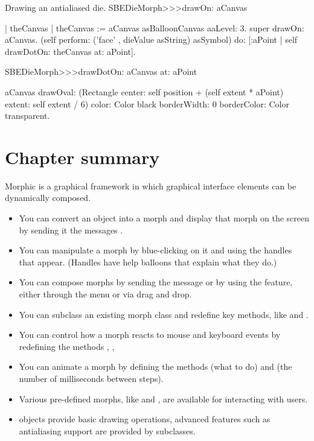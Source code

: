 \documentclass[a4paper,10pt,twoside]{book}
\begin{document}
\begin{methods}[aadie]{Drawing an antialiased die.}
SBEDieMorph>>>drawOn: aCanvas

	| theCanvas |
	theCanvas := aCanvas asBalloonCanvas aaLevel: 3.
	super drawOn: aCanvas.
	(self perform: ('face' , dieValue asString) asSymbol) do: [:aPoint | 
		self drawDotOn: theCanvas at: aPoint].


SBEDieMorph>>>drawDotOn: aCanvas at: aPoint

	aCanvas
		drawOval: (Rectangle
			center: self position + (self extent * aPoint)
			extent: self extent / 6)
		color: Color black
		borderWidth: 0
		borderColor: Color transparent.
\end{methods}

\section{Chapter summary}

Morphic is a graphical framework in which graphical interface elements can be dynamically composed.

\begin{itemize}
  \item You can convert an object into a morph and display that morph on the screen by sending it the messages .
  \item You can manipulate a morph by blue-clicking on it and using the handles that appear.
  	(Handles have help balloons that explain what they do.)
  \item You can compose morphs by sending the message  or by using the  feature, either through the menu or via drag and drop.
  \item You can subclass an existing morph class and redefine key methods, like  and .
  \item You can control how a morph reacts to mouse and keyboard events by redefining the methods , , \etc
  \item You can animate a morph by defining the methods  (what to do) and  (the number of milliseconds between steps).
  \item Various pre-defined morphs, like  and , are available for interacting with users.
  \item {} objects provide basic drawing operations, advanced features such as antialiasing support are provided by  subclasses.
\end{itemize}

\ifx\wholebook\relax\else
\end{document}
